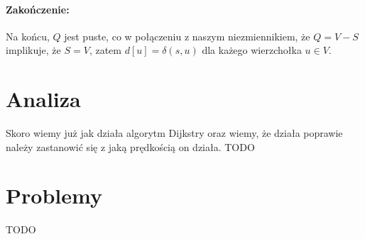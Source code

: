 \paragraph{Zakończenie:} Na końcu, $Q$ jest puste, co w połączeniu z naszym niezmiennikiem, że $Q = V - S$ implikuje,
że $S = V$, zatem $d[u] = \delta(s,u)$ dla każego wierzchołka $u \in V$.

\section{Analiza}

Skoro wiemy już jak działa algorytm Dijkstry oraz wiemy, że działa poprawie należy
zastanowić się z jaką prędkością on działa.
TODO
\section{Problemy}
TODO
